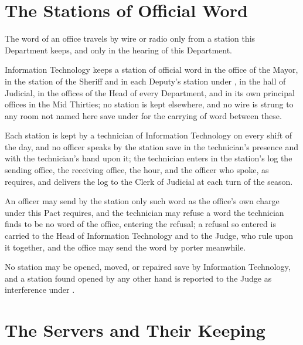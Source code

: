 \section{The Stations of Official Word}
\label{sec:it:stations-of-official-word}

The word of an office travels by wire or radio only from a station this Department keeps, and only in the hearing of this Department.

\begin{clauses}
\item Information Technology keeps a station of official word in the office of the Mayor, in the station of the Sheriff and in each Deputy's station under , in the hall of Judicial, in the offices of the Head of every Department, and in its own principal offices in the Mid Thirties; no station is kept elsewhere, and no wire is strung to any room not named here save under  for the carrying of word between these.
\item Each station is kept by a technician of Information Technology on every shift of the day, and no officer speaks by the station save in the technician's presence and with the technician's hand upon it; the technician enters in the station's log the sending office, the receiving office, the hour, and the officer who spoke, as  requires, and delivers the log to the Clerk of Judicial at each turn of the season.
\item An officer may send by the station only such word as the office's own charge under this Pact requires, and the technician may refuse a word the technician finds to be no word of the office, entering the refusal; a refusal so entered is carried to the Head of Information Technology and to the Judge, who rule upon it together, and the office may send the word by porter meanwhile.
\item No station may be opened, moved, or repaired save by Information Technology, and a station found opened by any other hand is reported to the Judge as interference under .
\end{clauses}

\section{The Servers and Their Keeping}
\label{sec:it:servers-and-their-keeping}

